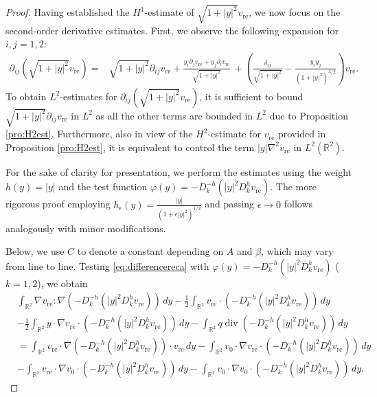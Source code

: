 \documentclass[12pt]{amsart}
\numberwithin{equation}{section}              %
\theoremstyle{remark}
\begin{document}
		\begin{proof}
			Having established the $H^1$-estimate of $\sqrt{1+|y|^2}v_{\text{re}}$, we now focus on the second-order derivative estimates. First, we observe the following expansion for $i,j=1,2$:
			\begin{equation*}
				\begin{aligned}
					\partial_{ij}(\sqrt{1+|y|^2}v_{\text{re}}) = & \sqrt{1+|y|^2} \partial_{ij} v_{\text{re}}
					+ \frac{y_i \partial_j v_{\text{re}} + y_j \partial_i v_{\text{re}}}{\sqrt{1+|y|^2}} \
					+ \left( \frac{\delta_{ij}}{\sqrt{1+|y|^2}} - \frac{y_i y_j}{(1+|y|^2)^{3/2}} \right) v_{\text{re}}.
				\end{aligned}
			\end{equation*}
			To obtain $L^2$-estimates for $\partial_{ij}(\sqrt{1+|y|^2}v_{\text{re}})$, it is sufficient to bound $\sqrt{1+|y|^2} \partial_{ij} v_{\text{re}}$ in $L^2$ as all the other terms are bounded in  $L^2$ due to Proposition \ref{pro:H2est}. Furthermore, also in view of the $H^2$-estimate for $v_{\text{re}}$ provided in Proposition \ref{pro:H2est}, it is equivalent to control the term $|y|\nabla^2 v_{\text{re}}$ in $L^2(\mathbb{R}^2)$.
			
			
			
            For the sake of clarity for presentation, we perform the estimates using the  weight $h(y) = |y|$ and the test function $\varphi(y) = -D_k^{-h} (|y|^2 D_k^h v_{\text{re}})$. The more rigorous proof employing  $h_\epsilon(y) = \frac{|y|}{(1+\epsilon|y|^2)^{1/2}}$ and passing $\epsilon \to 0$ follows analogously with minor modifications.
            
                 Below, we use $C$ to denote a constant depending on $A$ and $\beta$, which may vary from line to line.
			Testing \eqref{eq:differencereca} with $\varphi(y) = -D_k^{-h} (|y|^2 D_k^h v_{\text{re}})$ ($k=1,2$), we obtain
			\begin{equation}\label{eq:H2test}
				\begin{aligned}
					&\int_{\mathbb{R}^2} \nabla v_{\text{re}} : \nabla (-D_k^{-h} (|y|^2 D_k^h v_{\text{re}}) ) \, dy 
					- \frac{1}{2} \int_{\mathbb{R}^2} v_{\text{re}} \cdot (-D_k^{-h} (|y|^2 D_k^h v_{\text{re}})) \, dy \\
					& - \frac{1}{2} \int_{\mathbb{R}^2} y \cdot \nabla v_{\text{re}} \cdot (-D_k^{-h} (|y|^2 D_k^h v_{\text{re}}) ) \, dy - \int_{\mathbb{R}^2} q \operatorname{div} (-D_k^{-h} (|y|^2 D_k^h v_{\text{re}} )) \, dy \\
					&= \int_{\mathbb{R}^2} v_{\text{re}} \cdot \nabla (-D_k^{-h} (|y|^2 D_k^h v_{\text{re}}) ) \cdot v_{\text{re}} \, dy - \int_{\mathbb{R}^2} v_0 \cdot \nabla v_{\text{re}} \cdot (-D_k^{-h} (|y|^2 D_k^h v_{\text{re}})) \, dy \\
					& - \int_{\mathbb{R}^2} v_{\text{re}} \cdot \nabla v_0 \cdot (-D_k^{-h} (|y|^2 D_k^h v_{\text{re}}) ) \, dy - \int_{\mathbb{R}^2} v_0 \cdot \nabla v_0 \cdot (-D_k^{-h} (|y|^2 D_k^h v_{\text{re}})) \, dy.
				\end{aligned}
			\end{equation}
            

\end{proof}
\end{document}
